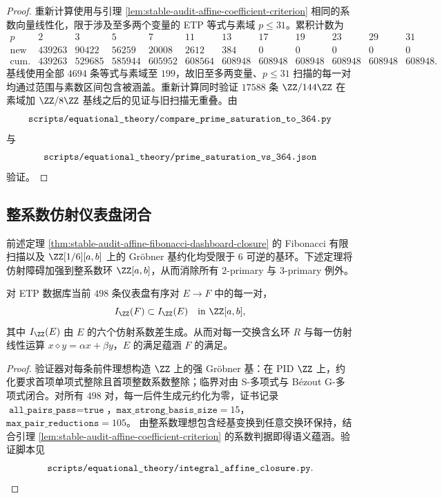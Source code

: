 \documentclass[../../main.tex]{subfiles}
\begin{document}
\begin{proof}
重新计算使用与引理 \ref{lem:stable-audit-affine-coefficient-criterion} 相同的系数向量线性化，限于涉及至多两个变量的 ETP 等式与素域 \(p\leq 31\)。累积计数为
\[
\begin{array}{c|rrrrrrrrrrr}
p&2&3&5&7&11&13&17&19&23&29&31\\
\hline
\text{new}&439263&90422&56259&20008&2612&384&0&0&0&0&0\\
\text{cum.}&439263&529685&585944&605952&608564&608948&
608948&608948&608948&608948&608948.
\end{array}
\]
\texttt{} 基线使用全部 \(4694\) 条等式与素域至 \(199\)，故旧至多两变量、\(p\leq 31\) 扫描的每一对均通过范围与素数区间包含被涵盖。重新计算同时验证 \(17588\) 条 \(\ZZ/144\ZZ\) 在素域加 \(\ZZ/8\ZZ\) 基线之后的见证与旧扫描无重叠。由
\[
    \texttt{\detokenize{scripts/equational_theory/compare_prime_saturation_to_364.py}}
\]
与
\[
    \texttt{\detokenize{scripts/equational_theory/prime_saturation_vs_364.json}}
\]
验证。
\end{proof}

\subsection{整系数仿射仪表盘闭合}

前述定理 \ref{thm:stable-audit-affine-fibonacci-dashboard-closure} 的 Fibonacci 有限扫描以及 \(\ZZ[1/6][a,b]\) 上的 Gröbner 基约化均受限于 \(6\) 可逆的基环。下述定理将仿射障碍加强到整系数环 \(\ZZ[a,b]\)，从而消除所有 \(2\)-primary 与 \(3\)-primary 例外。

\begin{theorem}[整系数仿射仪表盘闭合]\label{thm:stable-audit-integral-affine-closure}
对 ETP 数据库当前 \(498\) 条仪表盘有序对 \(E\to F\) 中的每一对，
\[
    I_{\ZZ}(F)\subset I_{\ZZ}(E)\quad\text{in }\ZZ[a,b],
\]
其中 \(I_{\ZZ}(E)\) 由 \(E\) 的六个仿射系数差生成。从而对每一交换含幺环 \(R\) 与每一仿射线性运算 \(x\diamond y=\alpha x+\beta y\)，\(E\) 的满足蕴涵 \(F\) 的满足。
\end{theorem}

\begin{proof}
验证器对每条前件理想构造 \(\ZZ\) 上的强 Gröbner 基：在 PID \(\ZZ\) 上，约化要求首项单项式整除且首项整数系数整除；临界对由 S-多项式与 Bézout G-多项式闭合。对所有 \(498\) 对，每一后件生成元约化为零，证书记录
\(\texttt{all\_pairs\_pass}=\texttt{true}\)，\(\texttt{max\_strong\_basis\_size}=15\)，\(\texttt{max\_pair\_reductions}=105\)。
由整系数理想包含经基变换到任意交换环保持，结合引理 \ref{lem:stable-audit-affine-coefficient-criterion} 的系数判据即得语义蕴涵。验证脚本见
\[
    \texttt{\detokenize{scripts/equational_theory/integral_affine_closure.py}}.
\]
\end{proof}
\end{document}

